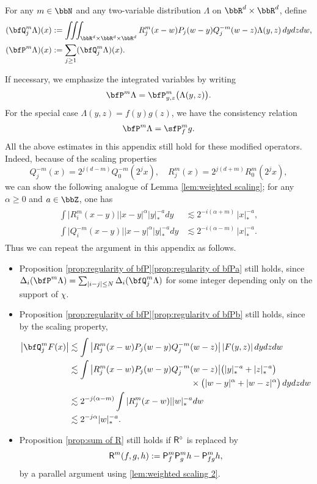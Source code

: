 \begin{defn}
For any $m\in\bbN$ and any two-variable distribution $\Lambda$ on $\bbR^d\times\bbR^d$, define
\begin{align*}
(\bfQ_j^m \Lambda)(x) &:= \iiint_{\bbR^d\times\bbR^d\times\bbR^d} R_j^m(x-w)P_j(w-y)Q_j^{-m}(w-z) \Lambda(y,z)\,dydzdw, \\
(\bfP^m \Lambda)(x) &:= \sum_{j\ge1}(\bfQ_j^m\Lambda)(x).
\end{align*}
\end{defn}

If necessary, we emphasize the integrated variables by writing
\[
\bfP^m\Lambda =\bfP_{y,z}^m\bigl(\Lambda(y,z)\bigr).
\]
For the special case $\Lambda(y,z)=f(y)g(z)$, we have the consistency relation
\begin{align*}
\bfP^m\Lambda = {\sfP}^m_fg.
\end{align*}
All the above estimates in this appendix still hold for these modified operators. Indeed, because of the scaling properties
\[
Q_j^{-m}(x)=2^{j(d-m)}Q_0^{-m}(2^jx),\quad
R_j^m(x)=2^{j(d+m)}R_0^m(2^jx),
\]
we can show the following analogue of Lemma \ref{lem:weighted scaling}; for any $\alpha\ge0$ and $a\in\bbZ$, one has
\begin{align}\label{lem:weighted scaling 2}
\begin{aligned}
\int \big|R_i^m(x-y)\big| |x-y|^\alpha|y|_*^{-a}dy&\lesssim2^{-i(\alpha+m)}\,|x|_*^{-a}, \\
\int \big|Q_i^{-m}(x-y)\big| |x-y|^\alpha|y|_*^{-a}dy&\lesssim2^{-i(\alpha-m)}\,|x|_*^{-a}.
\end{aligned}
\end{align}
Thus we can repeat the argument in this appendix as follows.
\begin{itemize}
\item Proposition \ref{prop:regularity of bfP}\eqref{prop:regularity of bfPa} still holds, since $\Delta_i(\bfP^m\Lambda)=\sum_{|i-j|\le N}\Delta_i(\bfQ_j^m\Lambda)$ for some integer depending only on the support of $\chi$.
\item Proposition \ref{prop:regularity of bfP}\eqref{prop:regularity of bfPb} still holds, since by the scaling property,
\begin{align*}
\big|\bfQ_j^mF(x)\big| &\lesssim \int \big|R_j^m(x-w)P_j(w-y)Q_j^{-m}(w-z)\big| \,|F(y,z)|\, dydzdw \\
&\lesssim \int \big|R_j^m(x-w)P_j(w-y)Q_j^{-m}(w-z)\big| \bigl(|y|_*^{-a}+|z|_*^{-a}\bigr)\\[-5pt]
& \hspace*{5cm}\times\bigl(|w-y|^\alpha+|w-z|^\alpha\bigr) \,dydzdw \\
&\lesssim 2^{-j(\alpha-m)}\int |R_j^m(x-w)| |w|_*^{-a}dw\\
&\lesssim 2^{-j\alpha}|w|_*^{-a}.
\end{align*}

\item Proposition \ref{prop:sum of R} still holds if ${\sf R}^{\circ}$ is replaced by
\[
{\sf R}^m(f,g,h):={\sf P}_f^m{\sf P}^m_gh-{\sf P}^m_{fg}h,
\]
by a parallel argument using \eqref{lem:weighted scaling 2}.
\end{itemize}

